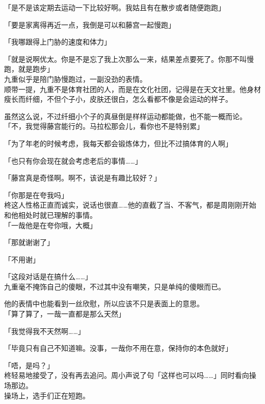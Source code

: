 「是不是该定期去运动一下比较好啊。我姑且有在散步或者随便跑跑」

「要是家离得再近一点，我倒是可以和藤宫一起慢跑」

「我哪跟得上门胁的速度和体力」

「就是说啊优太。你是不是忘了我上次那么一来，结果差点要死了。你那不叫慢跑，就是跑步」\\

九重似乎是陪门胁慢跑过，一副没劲的表情。\\

顺带一提，九重不是体育社团的人，而是在文化社团，记得是在天文社里。他身材瘦长而纤细，不但个子小，皮肤还很白，怎么看都不像是会运动的样子。

虽然这么说，不过纤细小个子的真昼倒是样样运动都能做，也不能一概而论。\\

「不，我觉得藤宫能行的。马拉松那会儿，看你也不是特别累」

「为了年老的时候考虑，我每天都会锻炼体力，但比不过搞体育的人啊」

「也只有你会现在就会考虑老后的事情……」

「藤宫真是奇怪啊。啊不，该说是有趣比较好？」

「你那是在夸我吗」\\

柊这人性格正直而诚实，说话也很直……他的直截了当、不客气，都是周刚刚开始和他相处时就已理解的事情。\\

「一哉他是在夸你哦，大概」

「那就谢谢了」

「不用谢」

「这段对话是在搞什么……」\\

九重毫不掩饰自己的傻眼，不过其中没有嘲笑，只是单纯的傻眼而已。

他的表情中也能看到一丝欣慰，所以应该不只是表面上的意思。\\

「算了算了，一哉一直都是那么天然」

「我觉得我不天然啊……」

「毕竟只有自己不知道嘛。没事，一哉你不用在意，保持你的本色就好」

「唔，是吗？」\\

柊轻易地接受了，没有再去追问。周小声说了句「这样也可以吗……」同时看向操场那边。\\

操场上，选手们正在短跑。\\


